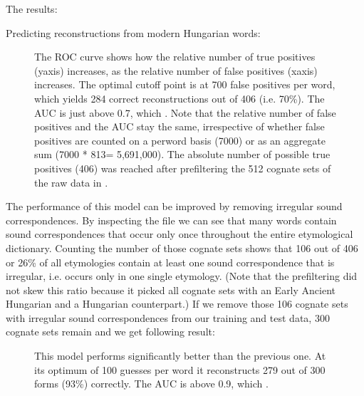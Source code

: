 \documentclass[letterpaper,10pt,english]{sphinxmanual}
\begin{document}
\sphinxAtStartPar
The results:

\sphinxAtStartPar
Predicting reconstructions from modern Hungarian words:

\begin{figure}[htbp]
\centering
\capstart

\noindent{}
\caption{The ROC curve shows how the relative number of true positives (y\sphinxhyphen{}axis)
increases, as the relative number of false positives (x\sphinxhyphen{}axis) increases.
The optimal cut\sphinxhyphen{}off point is at 700 false positives per word, which yields
284 correct reconstructions out of 406 (i.e. 70\%). The AUC is just above
0.7, which .
Note that the relative number of false positives and the AUC stay the same,
irrespective of whether false positives are counted on a
per\sphinxhyphen{}word basis (7000) or as an aggregate sum (7000 * 813= 5,691,000).
The absolute number of possible true positives (406) was reached after
prefiltering the 512 cognate sets of the raw data in .}\label{\detokenize{mkloanpy:id2}}\end{figure}

\sphinxAtStartPar
The performance of this model can be improved by removing irregular sound
correspondences. By inspecting the file  we can see that
many words contain sound correspondences that occur only once throughout
the entire etymological dictionary. Counting the number of those cognate sets
shows that 106 out of 406 or 26\% of all etymologies contain at least one sound
correspondence that is irregular, i.e. occurs only in one single etymology.
(Note that the pre\sphinxhyphen{}filtering did not skew this ratio because it picked all
cognate sets with an Early Ancient Hungarian and a Hungarian counterpart.)
If we remove those 106 cognate sets with irregular sound correspondences
from our training and test data, 300 cognate sets remain and we get following
result:

\begin{figure}[htbp]
\centering
\capstart

\noindent{}
\caption{This model performs significantly better than the previous one. At its
optimum of 100 guesses per word it reconstructs 279 out of 300 forms (93\%)
correctly. The
AUC is above 0.9, which .}\label{\detokenize{mkloanpy:id3}}\end{figure}
\end{document}

